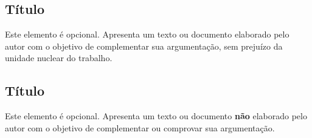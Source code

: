 \documentclass[
        english,			
        brazil			        %
        ,<...>]{abntbibufjf}
\begin{document}


\postextual 









\begin{apendicesenv}

\chapter{T\'itulo}

Este elemento \'e opcional. Apresenta um texto ou documento elaborado pelo autor com o objetivo de complementar sua argumenta\c{c}\~ao, 
sem preju\'izo da unidade nuclear do trabalho.

\end{apendicesenv}


\begin{anexosenv}

\chapter{T\'itulo}


Este elemento \'e opcional. Apresenta um texto ou documento \textbf{n\~ao} elaborado pelo autor com o objetivo de complementar ou comprovar sua 
argumenta\c{c}\~ao. 


\end{anexosenv}

\end{document}

